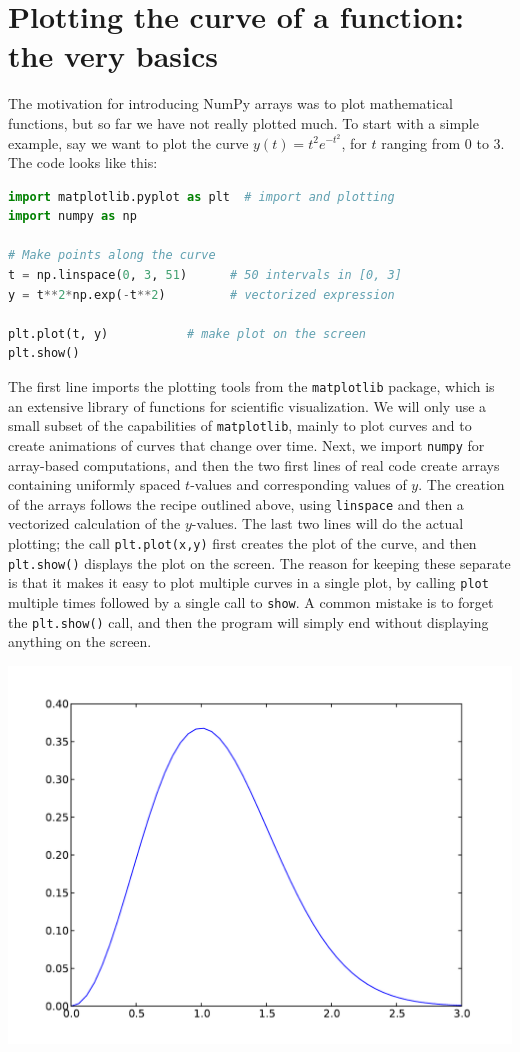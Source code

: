 \documentclass[graybox,envcountchap,sectrefs,final]{svmonodo}
\begin{document}
\section{Plotting the curve of a function: the very basics}
The motivation for introducing NumPy arrays was to plot mathematical functions, but so far we have not really
plotted much. To start with a simple example, say we want to plot the curve $y(t) = t^2e^{-t^2}$, for $t$ ranging
from 0 to 3. The code looks like this:
\begin{lstlisting}[language=Python,style=blue1]
import matplotlib.pyplot as plt  # import and plotting
import numpy as np

# Make points along the curve
t = np.linspace(0, 3, 51)      # 50 intervals in [0, 3]
y = t**2*np.exp(-t**2)         # vectorized expression

plt.plot(t, y)           # make plot on the screen
plt.show()
\end{lstlisting}
The first line imports the plotting tools from the \texttt{matplotlib} package, which is an extensive library of
functions for scientific visualization. We will only use a small subset of the capabilities of \texttt{matplotlib},
mainly to plot curves and to create animations of curves that change over time. Next, we import \texttt{numpy} for
array-based computations, and then the two first lines of real code create arrays containing
uniformly spaced $t$-values and corresponding values of $y$. The creation of the arrays follows the recipe
outlined above, using \texttt{linspace} and then a vectorized calculation of the $y$-values. The last two lines
will do the actual plotting; the call \texttt{plt.plot(x,y)} first creates the plot of the curve, and then
\texttt{plt.show()} displays the plot on the screen. The reason for keeping these separate is that it makes it easy
to plot multiple curves in a single plot, by calling \texttt{plot} multiple times followed by a single call to \texttt{show}.
A common mistake is to forget the \texttt{plt.show()} call, and then the program will simply end without displaying
anything on the screen.



\vspace{6mm}

\centerline{\includegraphics[width=0.5\linewidth]{../chapters/fig-plot/plot1a_pylab.pdf}}
\end{document}

